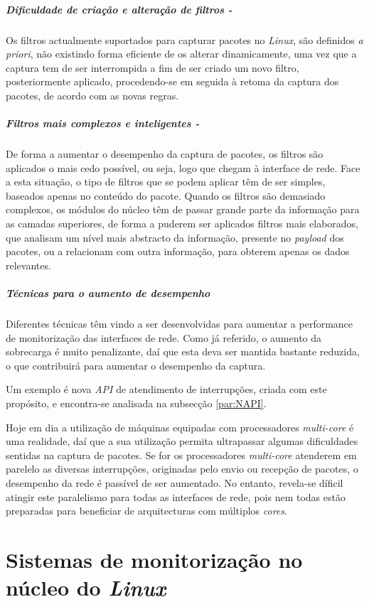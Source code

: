\subparagraph*{Dificuldade de criação e alteração de filtros - }
Os filtros actualmente suportados para capturar pacotes no \textit{Linux}, são definidos \textit{a priori}, não existindo forma eficiente de os alterar dinamicamente, uma vez que a captura tem de ser interrompida a fim de ser criado um novo filtro, posteriormente aplicado, procedendo-se em seguida à retoma da captura dos pacotes, de acordo com as novas regras.

\subparagraph*{Filtros mais complexos e inteligentes - }
De forma a aumentar o desempenho da captura de pacotes, os filtros são aplicados o mais cedo possível, ou seja, logo que chegam à interface de rede.
Face a esta situação, o tipo de filtros que se podem aplicar têm de ser simples, baseados apenas no conteúdo do pacote.
Quando os filtros são demasiado complexos, os módulos do núcleo têm de passar grande parte da informação para as camadas superiores, de forma a puderem ser aplicados filtros mais elaborados, que analisam um nível mais abstracto da informação, presente no \textit{payload} dos pacotes, ou a relacionam com outra informação, para obterem apenas os dados relevantes.

\subparagraph*{Técnicas para o aumento de desempenho}
Diferentes técnicas têm vindo a ser desenvolvidas para aumentar a performance de monitorização das interfaces de rede.
Como já referido, o aumento da sobrecarga é muito penalizante, daí que esta deva ser mantida bastante reduzida, o que contribuirá para aumentar o desempenho da captura.

Um exemplo é nova \textit{API} de atendimento de interrupções, criada com este propósito, e encontra-se analisada na subsecção \ref{par:NAPI}.

Hoje em dia a utilização de máquinas equipadas com processadores \textit{multi-core} é uma realidade, daí que a sua utilização permita ultrapassar algumas dificuldades sentidas na captura de pacotes.
Se for os processadores \textit{multi-core} atenderem em parelelo as diversas interrupções, originadas pelo envio ou recepção de pacotes, o desempenho da rede é passível de ser aumentado.
No entanto, revela-se díficil atingir este paralelismo para todas as interfaces de rede, pois nem todas estão preparadas para beneficiar de arquitecturas com múltiplos \textit{cores}.

\section{Sistemas de monitorização no núcleo do \textit{Linux}}\label{sect:instrumentacao_casos_linux}

